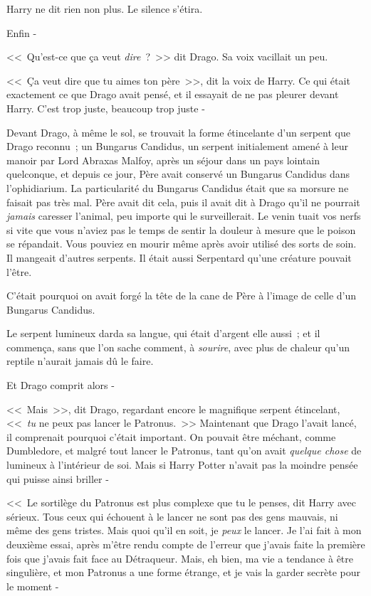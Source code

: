 Harry ne dit rien non plus. Le silence s'étira.

Enfin -

<<~Qu'est-ce que ça veut \emph{dire}~?~>> dit Drago. Sa voix vacillait un peu.

<<~Ça veut dire que tu aimes ton père~>>, dit la voix de Harry. Ce qui était exactement ce que Drago avait pensé, et il essayait de ne pas pleurer devant Harry. C'est trop juste, beaucoup trop juste -

Devant Drago, à même le sol, se trouvait la forme étincelante d'un serpent que Drago reconnu~; un Bungarus Candidus, un serpent initialement amené à leur manoir par Lord Abraxas Malfoy, après un séjour dans un pays lointain quelconque, et depuis ce jour, Père avait conservé un Bungarus Candidus dans l'ophidiarium. La particularité du Bungarus Candidus était que sa morsure ne faisait pas très mal. Père avait dit cela, puis il avait dit à Drago qu'il ne pourrait \emph{jamais} caresser l'animal, peu importe qui le surveillerait. Le venin tuait vos nerfs si vite que vous n'aviez pas le temps de sentir la douleur à mesure que le poison se répandait. Vous pouviez en mourir même après avoir utilisé des sorts de soin. Il mangeait d'autres serpents. Il était aussi Serpentard qu'une créature pouvait l'être.

C'était pourquoi on avait forgé la tête de la cane de Père à l'image de celle d'un Bungarus Candidus.

Le serpent lumineux darda sa langue, qui était d'argent elle aussi~; et il commença, sans que l'on sache comment, à \emph{sourire}, avec plus de chaleur qu'un reptile n'aurait jamais dû le faire.

Et Drago comprit alors -

<<~Mais~>>, dit Drago, regardant encore le magnifique serpent étincelant, <<~\emph{tu} ne peux pas lancer le Patronus.~>> Maintenant que Drago l'avait lancé, il comprenait pourquoi c'était important. On pouvait être méchant, comme Dumbledore, et malgré tout lancer le Patronus, tant qu'on avait \emph{quelque chose} de lumineux à l'intérieur de soi. Mais si Harry Potter n'avait pas la moindre pensée qui puisse ainsi briller -

<<~Le sortilège du Patronus est plus complexe que tu le penses, dit Harry avec sérieux. Tous ceux qui échouent à le lancer ne sont pas des gens mauvais, ni même des gens tristes. Mais quoi qu'il en soit, je \emph{peux} le lancer. Je l'ai fait à mon deuxième essai, après m'être rendu compte de l'erreur que j'avais faite la première fois que j'avais fait face au Détraqueur. Mais, eh bien, ma vie a tendance à être singulière, et mon Patronus a une forme étrange, et je vais la garder secrète pour le moment -

